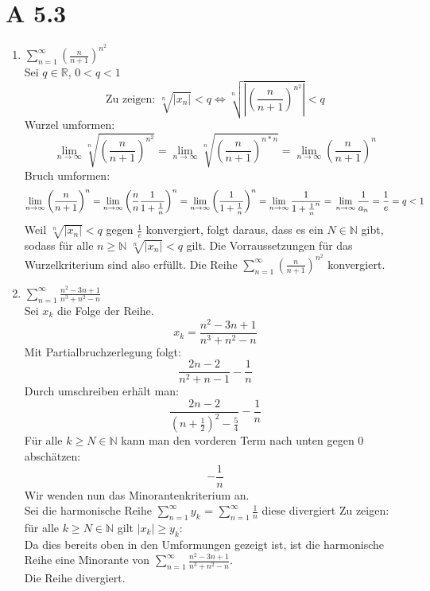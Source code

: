 \documentclass{article}
\begin{document}
    \section*{A 5.3}
    \begin{enumerate}[ label= (\roman*) ]
        \item \( \sum_{n=1}^{\infty} {\left( \frac{n}{n+1} \right)}^{n^2} \) \\
        Sei \(q \in \mathbb{R}\), \(0 < q < 1\) \\
        \[ \text{Zu zeigen: } \sqrt[n]{|x_n|} < q \Leftrightarrow \sqrt[n]{ \left| {\left( \frac{n}{n+1} \right)}^{n^2} \right| } < q \]
        Wurzel umformen:
        \[ 
            \lim_{n \to \infty} \sqrt[n]{ {\left( \frac{n}{n+1} \right)}^{n^2} } =
            \lim_{n \to \infty} \sqrt[n]{ {\left( \frac{n}{n+1} \right)}^{n * n} } = 
            \lim_{n \to \infty} {\left( \frac{n}{n+1} \right)}^{n}
        \]
        Bruch umformen:
        \[
            \lim_{n \to \infty} {\left( \frac{n}{n+1} \right)}^{n} =
            \lim_{n \to \infty} {\left( \frac{n}{n} \frac{1}{1+ \frac{1}{n}} \right)}^{n} =
            \lim_{n \to \infty} {\left( \frac{1}{1+ \frac{1}{n}} \right)}^{n} = 
            \lim_{n \to \infty} \frac{1}{ { 1 + \frac{1}{n} }^{n} } = \\
            \lim_{n \to \infty} \frac{1}{ a_n } =
            \frac{1}{e} = q < 1
        \]
        Weil \(\sqrt[n]{|x_n|} < q\) gegen \(\frac{1}{e}\) konvergiert,
        folgt daraus, dass es ein \(N \in \mathbb{N}\) gibt, sodass für alle \(n \geq \mathbb{N} \) \(\sqrt[n]{|x_n|} < q\) gilt.
        Die Vorraussetzungen für das Wurzelkriterium sind also erfüllt.
        Die Reihe \( \sum_{n=1}^{\infty} {\left( \frac{n}{n+1} \right)}^{n^2} \) konvergiert.

        \item \( \sum_{n=1}^{\infty} \frac{ n^2 -3n + 1 }{ n^3 + n^2 - n} \) \\
        Sei \(x_k\) die Folge der Reihe.
        \[ x_k = \frac{ n^2 -3n + 1 }{ n^3 + n^2 - n} \]
        Mit Partialbruchzerlegung folgt:
        \[ \frac{2n - 2}{n^2 + n -1} - \frac{1}{n}\]
        Durch umschreiben erhält man:
        \[ \frac{2n - 2}{ {(n+\frac{1}{2})}^2 - \frac{5}{4} }  - \frac{1}{n}\]
        Für alle \(k \geq N \in \mathbb{N}\) kann man den vorderen Term nach unten gegen 0 abschätzen:
        \[ - \frac{1}{n} \]
        Wir wenden nun das Minorantenkriterium an. \\
        Sei die harmonische Reihe \( \sum_{n=1}^{\infty} y_k \) =  \( \sum_{n=1}^{\infty} \frac{1}{n} \) diese divergiert
        Zu zeigen: für alle \( k \geq N \in \mathbb{N} \) gilt \( |x_k| \geq y_k\): \\
        Da dies bereits oben in den Umformungen gezeigt ist, ist die harmonische Reihe
        eine Minorante von \( \sum_{n=1}^{\infty} \frac{ n^2 -3n + 1 }{ n^3 + n^2 - n} \). \\
        Die Reihe divergiert.


\end{enumerate}
\end{document}
